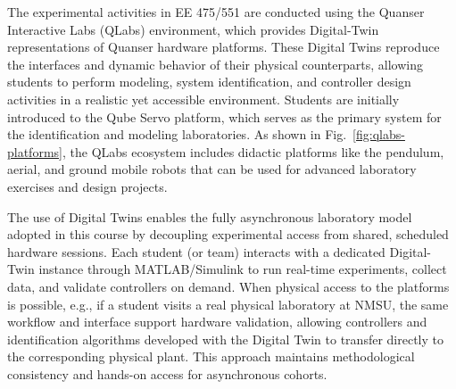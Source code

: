 \documentclass[journal]{IEEEtran}
\begin{document}

The experimental activities in EE 475/551 are conducted using the Quanser Interactive Labs (QLabs) environment, which provides Digital-Twin representations of Quanser hardware platforms. These Digital Twins reproduce the interfaces and dynamic behavior of their physical counterparts, allowing students to perform modeling, system identification, and controller design activities in a realistic yet accessible environment. Students are initially introduced to the Qube Servo platform, which serves as the primary system for the identification and modeling laboratories. As shown in Fig.~\ref{fig:qlabs-platforms}, the QLabs ecosystem includes didactic platforms like the pendulum, aerial, and ground mobile robots that can be used for advanced laboratory exercises and design projects.




The use of Digital Twins enables the fully asynchronous laboratory model adopted in this course by decoupling experimental access from shared, scheduled hardware sessions. Each student (or team) interacts with a dedicated Digital-Twin instance through MATLAB/Simulink to run real-time experiments, collect data, and validate controllers on demand. 
%
When physical access to the platforms is possible, e.g., if a student visits a real physical laboratory at NMSU, the same workflow and interface support hardware validation, allowing controllers and identification algorithms developed with the Digital Twin to transfer directly to the corresponding physical plant. This approach maintains methodological consistency and hands-on access for asynchronous cohorts.
\end{document}
